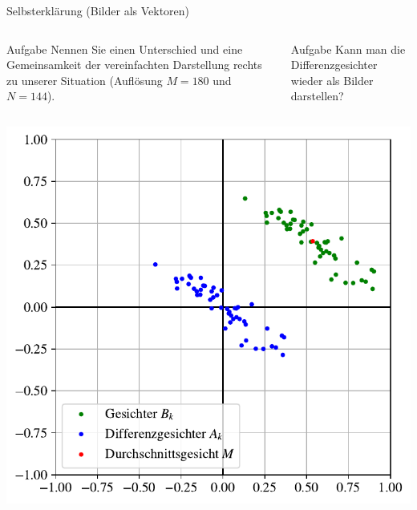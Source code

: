 \documentclass[10pt,aspectratio=169]{beamer}
\begin{document}
\begin{frame}[fragile]{Selbsterklärung (Bilder als Vektoren)}
	\begin{minipage}{0.6\textwidth}
		\begin{columns}[T,onlytextwidth]
			\column{\textwidth}
			\begin{block}{Aufgabe}
				Nennen Sie einen Unterschied und eine Gemeinsamkeit der vereinfachten Darstellung rechts zu unserer Situation (Auflösung $M=180$ und $N=144$).
			\end{block}
			\begin{block}{Aufgabe}
				Kann man die Differenzgesichter wieder als Bilder darstellen?
			\end{block}
		\end{columns}
	\end{minipage}\hfill
	\begin{minipage}{0.35\textwidth}
		\includegraphics[width=\textwidth]{images/facespace/meandiff}
	\end{minipage}
\end{frame}
\end{document}
